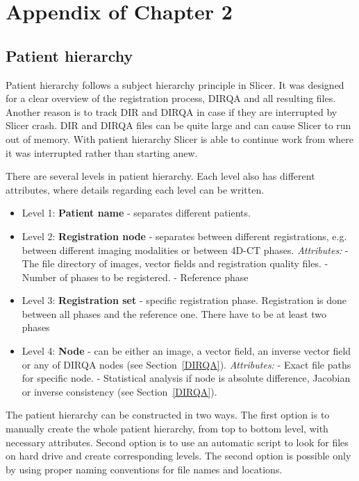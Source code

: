 \chapter{Appendix of Chapter 2}
\label{AppendixA}
\minitoc

\section{Patient hierarchy}
\label{RegHierarchy}

Patient hierarchy follows a subject hierarchy principle in Slicer. It was designed for a clear overview of the registration process, DIRQA and all resulting files. Another reason is to track DIR
and DIRQA in case if they are interrupted by Slicer crash. DIR and DIRQA files can be quite large and can cause Slicer to run out of memory. With patient hierarchy Slicer is able to continue work
from where it was interrupted rather than starting anew.

There are several levels in patient hierarchy. Each level also has different attributes, where details regarding each level can be written.

\begin{itemize}
	\item Level 1: \textbf{Patient name} - separates different patients.
	\item Level 2: \textbf{Registration node} - separates between different registrations, e.g. between different imaging modalities or between 4D-CT phases. 
	\subitem \textit{Attributes:}
	\subitem - The file directory of images, vector fields and registration quality files.
	\subitem - Number of phases to be registered.
	\subitem - Reference phase
	\item Level 3: \textbf{Registration set} - specific registration phase. Registration is done between all phases and the reference one. There have to be at least two phases
	\item Level 4: \textbf{Node} - can be either an image, a vector field, an inverse vector field or any of DIRQA nodes (see Section~\ref{DIRQA}).
	\subitem \textit{Attributes:}
	\subitem - Exact file paths for specific node.
	\subitem - Statistical analysis if node is absolute difference, Jacobian or inverse consistency (see Section~\ref{DIRQA}).
\end{itemize}

The patient hierarchy can be constructed in two ways. The first option is to manually create the whole patient hierarchy, from top to bottom level, with necessary attributes. Second option is to use an automatic script to look 
for files on hard drive and create corresponding levels. The second option is possible only by using proper naming conventions for file names and locations.

